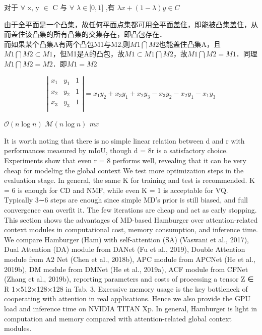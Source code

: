 \documentclass{article}
\begin{document}
对于 $\forall$ x, y $\in$ C 与 $\forall$  $\lambda\in \lbrack 0, 1 \rbrack $ ,有
$\lambda x + (1-\lambda)y \in C$


由于全平面是一个凸集，故任何平面点集都可用全平面盖住，即能被凸集盖住，从而盖住该凸集的所有凸集的交集存在，即凸包存在． \\

而如果某个凸集A有两个凸包M1与M2,则$M1 \bigcap M2$也能盖住凸集A，且$M1 \bigcap M2 \subset M1$，但M1是A的凸包，故$ M1 \subset M1 \bigcap M2$，故$M1 \bigcap M2 = M1$．同理$M1 \bigcap M2 = M2$．即$M1 = M2$


$$
\left|
\begin{matrix}
x_1 & y_1 & 1 \\
x_2 & y_2 & 1 \\
x_3 & y_3 & 1 \\
\end{matrix}
\right| = x_1y_2+x_3y_1+x_2y_3-x_3y_2-x_2y_1-x_1y_3
$$

$\mathcal{O}(n\log{}n)$
$\mathcal{M}(n\log{}n)$
\emph{mx}

It is worth noting that there is no simple linear relation between d and r with performances measured by mIoU, though d = 8r is a satisfactory choice. Experiments show that even r = 8 performs well, revealing that it can be very cheap for modeling the global context
We test more optimization steps in the evaluation stage. In general, the same K for training and test is recommended. K = 6 is enough for CD and NMF, while even K = 1 is acceptable for VQ. Typically 3∼6 steps are enough since simple MD’s prior is still biased, and full convergence can overfit it. The few iterations are cheap and act as early stopping.
This section shows the advantages of MD-based Hamburger over attention-related context modules in computational cost, memory consumption, and inference time. We compare Hamburger (Ham) with self-attention (SA) (Vaswani et al., 2017), Dual Attention (DA) module from DANet (Fu et al., 2019), Double Attention module from A2 Net (Chen et al., 2018b), APC module from APCNet (He et al.,
2019b), DM module from DMNet (He et al., 2019a), ACF module from CFNet (Zhang et al., 2019b), reporting parameters and costs of processing a tensor Z ∈ R 1×512×128×128 in Tab. 3. Excessive memory usage is the key bottleneck of cooperating with attention in real applications. Hence we also
provide the GPU load and inference time on NVIDIA TITAN Xp. In general, Hamburger is light in
computation and memory compared with attention-related global context modules.
\end{document}
